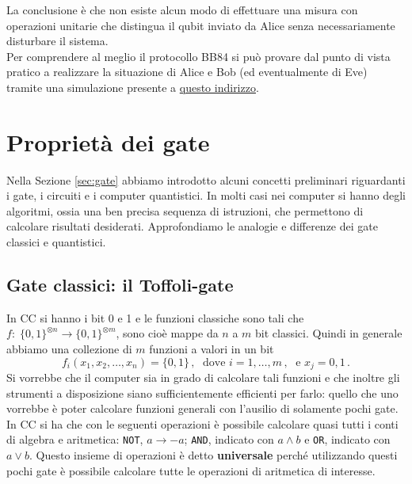\noindent La conclusione è che non esiste alcun modo di effettuare una misura con operazioni unitarie che distingua il qubit inviato da Alice senza necessariamente disturbare il sistema. \\
Per comprendere al meglio il protocollo BB84 si può provare dal punto di vista pratico a realizzare la situazione di Alice e Bob (ed eventualmente di Eve) tramite una simulazione presente a \href{https://www.st-andrews.ac.uk/physics/quvis/simulations_html5/sims/cryptography-bb84/Quantum_Cryptography.html}{questo indirizzo}.

\section{Proprietà dei gate}\label{sec:gate_properties}
Nella Sezione \ref{sec:gate} abbiamo introdotto alcuni concetti preliminari riguardanti i gate, i circuiti e i computer quantistici. In molti casi nei computer si hanno degli algoritmi, ossia una ben precisa sequenza di istruzioni, che permettono di calcolare risultati desiderati. Approfondiamo le analogie e differenze dei gate classici e quantistici.

\subsection{Gate classici: il Toffoli-gate}
In CC si hanno i bit 0 e 1 e le funzioni classiche sono tali che $f: \; \{ 0,1 \}^{\otimes n} \rightarrow \{ 0,1 \}^{\otimes m}$, sono cioè mappe da $n$ a $m$ bit classici. Quindi in generale abbiamo una collezione di $m$ funzioni a valori in un bit
\begin{equation*}
    f_i(x_1, x_2, \ldots, x_n) = \{ 0, 1 \} \, , \; \text{ dove } i = 1, \ldots , m \, , \; \text{ e } x_j = 0, 1 \, .
\end{equation*}
Si vorrebbe che il computer sia in grado di calcolare tali funzioni e che inoltre gli strumenti a disposizione siano sufficientemente efficienti per farlo: quello che uno vorrebbe è poter calcolare funzioni generali con l'ausilio di solamente pochi gate. In CC si ha che con le seguenti operazioni è possibile calcolare quasi tutti i conti di algebra e aritmetica: \texttt{NOT}, $a \rightarrow -a$; \texttt{AND}, indicato con $a \land b$ e \texttt{OR}, indicato con $a \lor b$. Questo insieme di operazioni è detto \textbf{universale} perché utilizzando questi pochi gate è possibile calcolare tutte le operazioni di aritmetica di interesse. 

